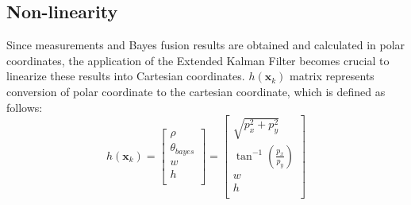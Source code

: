 \newpage
\subsection{Non-linearity}\label{equ:2_non_linear}
Since measurements and Bayes fusion results are obtained and calculated in polar coordinates, 
the application of the Extended Kalman Filter becomes crucial to linearize these results into Cartesian coordinates. 
$h(\mathbf{x}_k)$ matrix represents conversion of polar coordinate to the cartesian coordinate, which is defined as follows:
\begin{equation}
    h(\mathbf{x}_k)=
    \begin{bmatrix}
        \rho \\ 
        \theta_{bayes}\\
        w \\
        h \\
    \end{bmatrix}=
    \begin{bmatrix}
    \sqrt{p_x^2+p_y^2}\\
    \tan^{-1}(\frac{p_x}{p_y})\\
    w \\
    h \\
    \end{bmatrix}
\end{equation}

